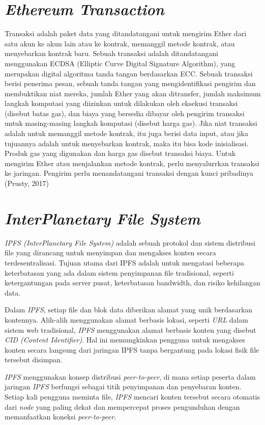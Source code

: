 \section{\emph{Ethereum Transaction}}

Transaksi adalah paket data yang ditandatangani untuk mengirim Ether dari satu akun ke akun lain atau ke kontrak, memanggil
metode kontrak, atau menyebarkan kontrak baru. Sebuah transaksi adalah ditandatangani menggunakan ECDSA (Elliptic Curve Digital
Signature Algorithm), yang merupakan digital algoritma tanda tangan berdasarkan ECC. Sebuah transaksi berisi penerima pesan,
sebuah tanda tangan yang mengidentifikasi pengirim dan membuktikan niat mereka, jumlah Ether yang akan ditransfer, jumlah
maksimum langkah komputasi yang diizinkan untuk dilakukan oleh eksekusi transaksi (disebut batas gas), dan biaya yang
bersedia dibayar oleh pengirim transaksi untuk masing-masing langkah komputasi (disebut harga gas). Jika niat transaksi
adalah untuk memanggil metode kontrak, itu juga berisi data input, atau jika tujuannya adalah untuk menyebarkan kontrak,
maka itu bisa kode inisialisasi. Produk gas yang digunakan dan harga gas disebut transaksi biaya. Untuk mengirim Ether atau
menjalankan metode kontrak, perlu menyalurrkan transaksi ke jaringan. Pengirim perlu menandatangani transaksi dengan kunci
pribadinya (Prusty, 2017)

\section{\emph{InterPlanetary File System}}

\emph{IPFS (InterPlanetary File System)} adalah sebuah protokol dan sistem distribusi file yang dirancang untuk menyimpan dan
mengakses konten secara terdesentralisasi. Tujuan utama dari IPFS adalah untuk mengatasi beberapa keterbatasan yang ada dalam sistem penyimpanan
file tradisional, seperti ketergantungan pada server pusat, keterbatasan bandwidth, dan risiko kehilangan data.

Dalam \emph{IPFS}, setiap file dan blok data diberikan alamat yang unik berdasarkan kontennya. Alih-alih menggunakan alamat berbasis lokasi,
seperti \emph{URL} dalam sistem web tradisional, \emph{IPFS} menggunakan alamat berbasis konten yang disebut \emph{CID (Content Identifier)}.
Hal ini memungkinkan pengguna untuk mengakses konten secara langsung dari jaringan IPFS tanpa bergantung pada lokasi fisik file tersebut disimpan. \parencite{benet2014ipfs}

\emph{IPFS} menggunakan konsep distribusi \emph{peer-to-peer}, di mana setiap peserta dalam jaringan \emph{IPFS} berfungsi sebagai titik penyimpanan dan penyebaran konten.
Setiap kali pengguna meminta file, \emph{IPFS} mencari konten tersebut secara otomatis dari \emph{node} yang paling dekat dan mempercepat proses pengunduhan dengan memanfaatkan koneksi \emph{peer-to-peer}.

